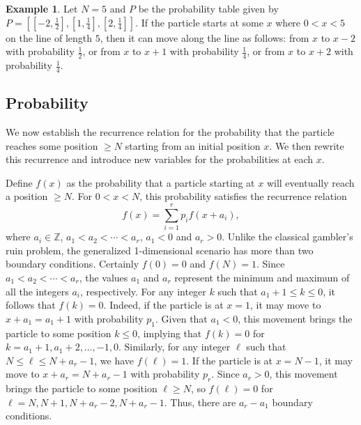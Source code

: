 \documentclass[reqno]{amsart}
\theoremstyle{definition}
\newtheorem{example}{Example}
\theoremstyle{definition}
\theoremstyle{remark}
\newcommand{\ZZ}{\mathbb{Z}}
\begin{document}
\begin{example}\label{ex:probability notation}
Let $N=5$ and $P$ be the probability table given by $P=\left[[-2,\frac{1}{2}],[1,\frac{1}{4}],[2,\frac{1}{4}]\right]$. If the particle starts at some $x$ where $0<x<5$ on the line of length $5$, then it can move along the line as follows: from $x$ to $x-2$ with probability $\frac{1}{2}$, or from $x$ to $x+1$ with probability $\frac{1}{4}$, or from $x$ to $x+2$ with probability $\frac{1}{4}$.
\end{example}

\subsection{Probability}\label{subsec:prob}
We now establish the recurrence relation for the probability that the particle reaches some position $\geq N$ starting from an initial position $x$. We then rewrite this recurrence and introduce new variables for the probabilities at each $x$.

Define $f(x)$ as the probability that a particle starting at $x$ will eventually reach a position $\geq N$. For $0<x<N$, this probability satisfies the recurrence relation
\begin{equation}\label{eq:generalprob}
    f(x)=\sum_{i=1}^r p_if(x+a_i),
\end{equation}
where $a_i\in \ZZ$, $a_1<a_2<\cdots <a_r$, $a_1<0$ and $a_r>0$. Unlike the classical gambler’s ruin problem, the generalized 1-dimensional scenario has more than two boundary conditions. Certainly $f(0)=0$ and $f(N)=1$. Since $a_1< a_2< \cdots< a_r$, the values $a_1$ and $a_r$ represent the minimum and maximum of all the integers $a_i$, respectively. For any integer $k$ such that $a_{1}+1 \leq k \leq 0$, it follows that $f(k)=0$. Indeed, if the particle is at $x=1$, it may move to $x+a_1=a_1+1$ with probability $p_1$. Given that $a_1<0$, this movement brings the particle to some position $k\leq 0$, implying that $f(k)=0$ for $k=a_1+1, a_1+2, \ldots, -1,0$. Similarly, for any integer $\ell$ such that $N \leq \ell \leq N+a_r-1$, we have $f(\ell)=1$. If the particle is at $x=N-1$, it may move to $x+a_r=N+a_r-1$ with probability $p_r$. Since $a_r>0$, this movement brings the particle to some position $\ell\geq N$, so $f(\ell)=0$ for $\ell=N,N+1,N+a_r-2,N+a_r-1$. 
Thus, there are $a_r-a_1$ boundary conditions.
        
\end{document}
